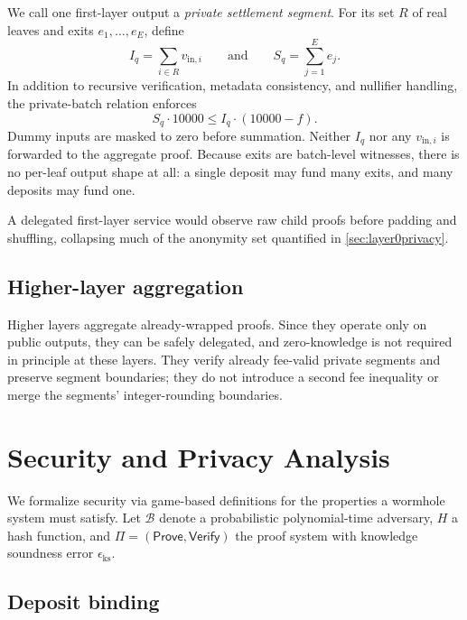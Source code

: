 \documentclass{iacrcc}
\begin{document}
We call one first-layer output a \emph{private settlement segment}. For its set \(R\) of real leaves and exits \(e_1,\ldots,e_E\), define
\[
I_q = \sum_{i\in R} v_{\mathrm{in},i}
\qquad\text{and}\qquad
S_q = \sum_{j=1}^{E} e_j.
\]
In addition to recursive verification, metadata consistency, and nullifier handling, the private-batch relation enforces
\[
S_q\cdot 10000 \leq I_q\cdot(10000-f).
\]
Dummy inputs are masked to zero before summation. Neither \(I_q\) nor any \(v_{\mathrm{in},i}\) is forwarded to the aggregate proof. Because exits are batch-level witnesses, there is no per-leaf output shape at all: a single deposit may fund many exits, and many deposits may fund one.

A delegated first-layer service would observe raw child proofs before padding and shuffling, collapsing much of the anonymity set quantified in \cref{sec:layer0privacy}.

\subsection{Higher-layer aggregation}

Higher layers aggregate already-wrapped proofs. Since they operate only on public outputs, they can be safely delegated, and zero-knowledge is not required in principle at these layers. They verify already fee-valid private segments and preserve segment boundaries; they do not introduce a second fee inequality or merge the segments' integer-rounding boundaries.

\section{Security and Privacy Analysis}
\label{sec:security}

We formalize security via game-based definitions for the properties a wormhole system must satisfy. Let \(\mathcal{B}\) denote a probabilistic polynomial-time adversary, \(H\) a hash function, and \(\Pi = (\mathsf{Prove}, \mathsf{Verify})\) the proof system with knowledge soundness error \(\epsilon_{\mathrm{ks}}\).

\subsection{Deposit binding}
\end{document}
